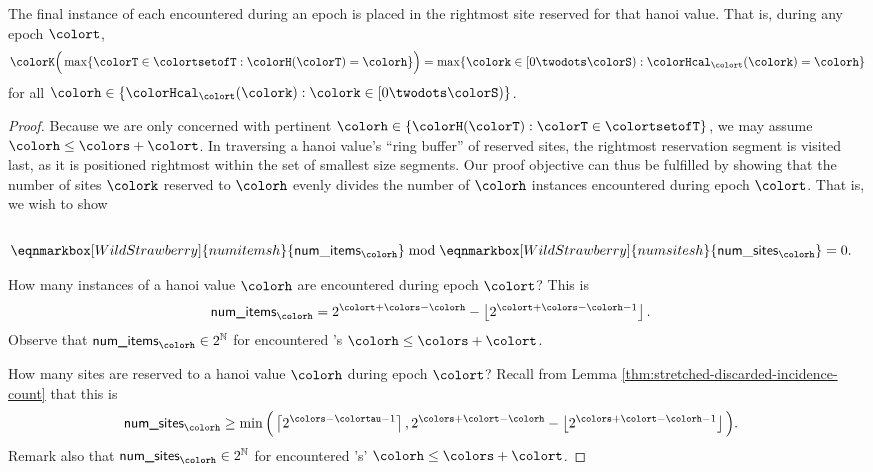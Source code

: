 \begin{lemma}
\label{thm:tilted-last-touched}
The final instance of each \hv{} encountered during an epoch is placed in the rightmost site reserved for that hanoi value.
That is, during any epoch $\colort$,
\begin{align*}
\colorK\Big(
  \max\{\colorT \in \colortsetofT : \colorH(\colorT) = \colorh\}
\Big)
=
\max\{\colork \in [0\twodots\colorS) : \colorHcal_{\colort}(\colork) = \colorh \}
\end{align*}
for all $\colorh \in \{\colorHcal_{\colort}(\colork) : \colork \in [0\twodots\colorS)\}$.
\end{lemma}

\begin{proof}
Because we are only concerned with pertinent \hv{} $\colorh \in \{\colorH(\colorT) : \colorT \in \colortsetofT\}$, we may assume $\colorh \leq \colors + \colort$.
In traversing a hanoi value's ``ring buffer'' of reserved sites, the rightmost reservation segment is visited last, as it is positioned rightmost within the set of smallest size segments.
Our proof objective can thus be fulfilled by showing that the number of sites $\colork$ reserved to \hv{} $\colorh$ evenly divides the number of \hv{} $\colorh$ instances encountered during epoch $\colort$.
That is, we wish to show
\begin{align*}
\\
\eqnmarkbox[WildStrawberry]{numitemsh}{
  \mathsf{num\_items}_{\colorh}
}
\bmod
\eqnmarkbox[WildStrawberry]{numsitesh}{
  \mathsf{num\_sites}_{\colorh}
}
&= 0.
\end{align*}

\annotate[yshift=1em]{above,right}{numsitesh}{$|\{
  \colork \in [0\twodots\colorS) : \colorHcal_{\colort}(\colork) = \colorh
\}|$}

How many instances of a hanoi value $\colorh$ are encountered during epoch $\colort$?
This is
\begin{align*}
\textsf{num\_items}_{\colorh}
&=
2^{\colort + \colors - \colorh} - \left\lfloor2^{\colort + \colors - \colorh - 1} \right\rfloor.
\end{align*}
Observe that $\textsf{num\_items}_{\colorh} \in 2^{\mathbb{N}}$ for encountered \hv{}'s $\colorh \leq \colors + \colort$.

How many sites are reserved to a hanoi value $\colorh$ during epoch $\colort$?
Recall from Lemma \ref{thm:stretched-discarded-incidence-count} that this is
\begin{align*}
\textsf{num\_sites}_{\colorh}
&\geq
\min\Big(
\left\lceil 2^{\colors - \colortau - 1} \right\rceil,
2^{\colors + \colort - \colorh} - \left\lfloor 2^{\colors + \colort - \colorh - 1} \right\rfloor
\Big).
\end{align*}
Remark also that $\textsf{num\_sites}_{\colorh} \in 2^{\mathbb{N}}$ for encountered \hv{}'s' $\colorh \leq \colors + \colort$.


\end{proof}
